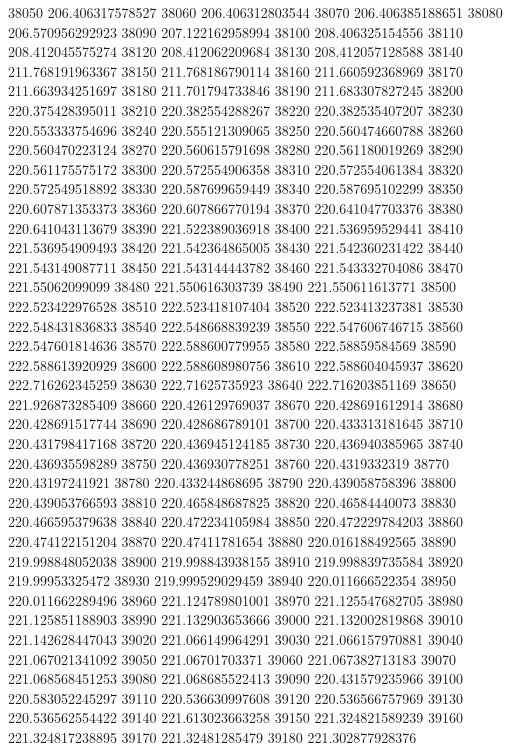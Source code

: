{38050 206.406317578527
38060 206.406312803544
38070 206.406385188651
38080 206.570956292923
38090 207.122162958994
38100 208.406325154556
38110 208.412045575274
38120 208.412062209684
38130 208.412057128588
38140 211.768191963367
38150 211.768186790114
38160 211.660592368969
38170 211.663934251697
38180 211.701794733846
38190 211.683307827245
38200 220.375428395011
38210 220.382554288267
38220 220.382535407207
38230 220.553333754696
38240 220.555121309065
38250 220.560474660788
38260 220.560470223124
38270 220.560615791698
38280 220.561180019269
38290 220.561175575172
38300 220.572554906358
38310 220.572554061384
38320 220.572549518892
38330 220.587699659449
38340 220.587695102299
38350 220.607871353373
38360 220.607866770194
38370 220.641047703376
38380 220.641043113679
38390 221.522389036918
38400 221.536959529441
38410 221.536954909493
38420 221.542364865005
38430 221.542360231422
38440 221.543149087711
38450 221.543144443782
38460 221.543332704086
38470 221.55062099099
38480 221.550616303739
38490 221.550611613771
38500 222.523422976528
38510 222.523418107404
38520 222.523413237381
38530 222.548431836833
38540 222.548668839239
38550 222.547606746715
38560 222.547601814636
38570 222.588600779955
38580 222.58859584569
38590 222.588613920929
38600 222.588608980756
38610 222.588604045937
38620 222.716262345259
38630 222.71625735923
38640 222.716203851169
38650 221.926873285409
38660 220.426129769037
38670 220.428691612914
38680 220.428691517744
38690 220.428686789101
38700 220.433313181645
38710 220.431798417168
38720 220.436945124185
38730 220.436940385965
38740 220.436935598289
38750 220.436930778251
38760 220.4319332319
38770 220.43197241921
38780 220.433244868695
38790 220.439058758396
38800 220.439053766593
38810 220.465848687825
38820 220.46584440073
38830 220.466595379638
38840 220.472234105984
38850 220.472229784203
38860 220.474122151204
38870 220.47411781654
38880 220.016188492565
38890 219.998848052038
38900 219.998843938155
38910 219.998839735584
38920 219.99953325472
38930 219.999529029459
38940 220.011666522354
38950 220.011662289496
38960 221.124789801001
38970 221.125547682705
38980 221.125851188903
38990 221.132903653666
39000 221.132002819868
39010 221.142628447043
39020 221.066149964291
39030 221.066157970881
39040 221.067021341092
39050 221.06701703371
39060 221.067382713183
39070 221.068568451253
39080 221.068685522413
39090 220.431579235966
39100 220.583052245297
39110 220.536630997608
39120 220.536566757969
39130 220.536562554422
39140 221.613023663258
39150 221.324821589239
39160 221.324817238895
39170 221.32481285479
39180 221.302877928376
}
